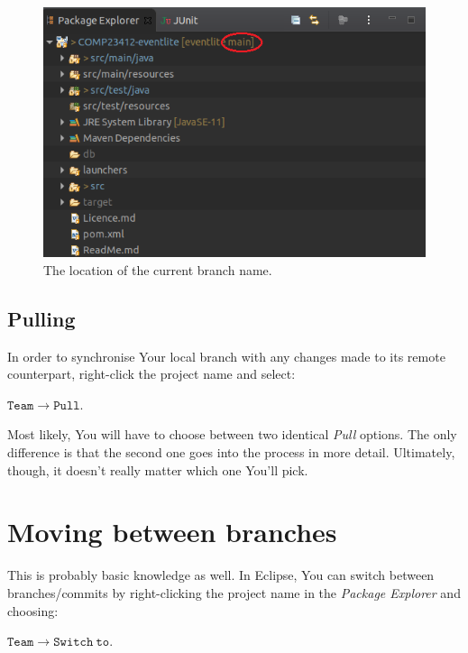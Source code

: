 \documentclass{article}
\begin{document}
\begin{figure}[h]
    \centering
    \includegraphics[scale=0.6]{branch_name.png}
    \caption{The location of the current branch name.}
    \label{fig:branch_name}
\end{figure}

\subsection{Pulling}
\label{sec:pulling}

In order to synchronise Your local branch with any changes made to its remote counterpart, right-click the project name and select:\newline

$\mathtt{Team \rightarrow Pull}$. \newline

Most likely, You will have to choose between two identical \textit{Pull} options. The only difference is that the second one goes into the process in more detail. Ultimately, though, it doesn't really matter which one You'll pick.

\section{Moving between branches}
\label{sec:switching}

This is probably basic knowledge as well. In Eclipse, You can switch between branches/commits by right-clicking the project name in the \textit{Package Explorer} and choosing:\newline

$\mathtt{Team \rightarrow Switch\ to}$.\newline
\end{document}
